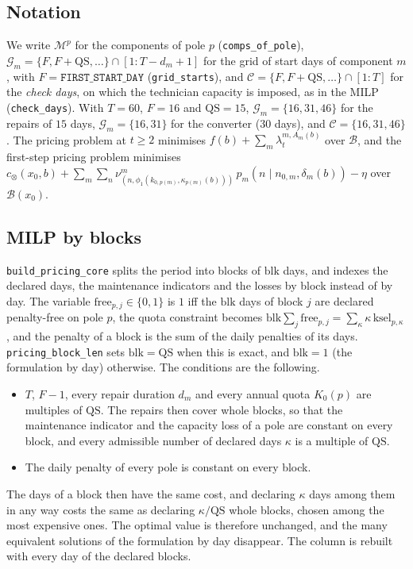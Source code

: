 \documentclass[11pt]{article}
\newcommand{\free}{\mathrm{free}}
\newcommand{\ksel}{\mathrm{ksel}}
\begin{document}
\subsection*{Notation}

We write $\mathcal M^p$ for the components of pole $p$ (\texttt{comps\_of\_pole}),
$\mathcal G_m = \{F, F + \mathrm{QS}, \ldots\} \cap [1 : T - d_m + 1]$ for the grid of start days
of component $m$, with $F = \texttt{FIRST\_START\_DAY}$ (\texttt{grid\_starts}), and $\mathcal C =
\{F, F + \mathrm{QS}, \ldots\} \cap [1:T]$ for the \emph{check days}, on which the technician
capacity is imposed, as in the MILP (\texttt{check\_days}). With $T = 60$, $F = 16$ and
$\mathrm{QS} = 15$, $\mathcal G_m = \{16, 31, 46\}$ for the repairs of $15$ days, $\mathcal G_m =
\{16, 31\}$ for the converter ($30$ days), and $\mathcal C = \{16, 31, 46\}$. The pricing problem
at $t \ge 2$ minimises $f(b) + \sum_m \lambda_t^{m, A_m(b)}$ over $\mathcal B$, and the first-step
pricing problem minimises $c_\otimes(x_0, b) + \sum_m \sum_n \nu^m_{(n, \phi_1(k_{0,p(m)},
\kappa_{p(m)}(b)))}\, p_m(n \mid n_{0,m}, \delta_m(b)) - \eta$ over $\mathcal B(x_0)$.

\subsection*{MILP by blocks}

\texttt{build\_pricing\_core} splits the period into blocks of $\mathrm{blk}$ days, and indexes
the declared days, the maintenance indicators and the losses by block instead of by day. The
variable $\free_{p,j} \in \{0,1\}$ is $1$ iff the $\mathrm{blk}$ days of block $j$ are declared
penalty-free on pole $p$, the quota constraint becomes $\mathrm{blk} \sum_j \free_{p,j} = \sum_\kappa
\kappa\, \ksel_{p,\kappa}$, and the penalty of a block is the sum of the daily penalties of its
days. \texttt{pricing\_block\_len} sets $\mathrm{blk} = \mathrm{QS}$ when this is exact, and
$\mathrm{blk} = 1$ (the formulation by day) otherwise. The conditions are the following.
\begin{itemize}
  \item $T$, $F - 1$, every repair duration $d_m$ and every annual quota $K_0(p)$ are multiples of
        $\mathrm{QS}$. The repairs then cover whole blocks, so that the maintenance indicator and the
        capacity loss of a pole are constant on every block, and every admissible number of
        declared days $\kappa$ is a multiple of $\mathrm{QS}$.
  \item The daily penalty of every pole is constant on every block.
\end{itemize}
The days of a block then have the same cost, and declaring $\kappa$ days among them in any way
costs the same as declaring $\kappa / \mathrm{QS}$ whole blocks, chosen among the most expensive
ones. The optimal value is therefore unchanged, and the many equivalent solutions of the
formulation by day disappear. The column is rebuilt with every day of the declared blocks.
\end{document}
